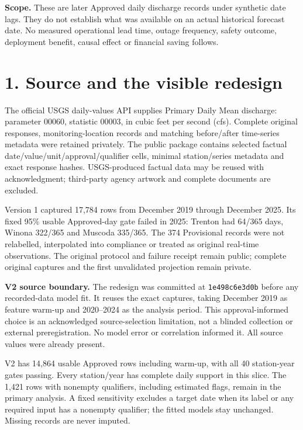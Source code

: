 \documentclass[11pt]{article}
\newcommand{\SourceRows}{14,864}
\newcommand{\QualifiedRows}{1,421}
\newcommand{\SourceGates}{40}
\newcommand{\TrentonApproval}{64}
\newcommand{\WinonaApproval}{322}
\newcommand{\MuscodaApproval}{335}
\begin{document}
\textbf{Scope.} These are later Approved daily discharge records under synthetic date lags. They do not establish what was available on an actual historical forecast date. No measured operational lead time, outage frequency, safety outcome, deployment benefit, causal effect or financial saving follows.

\clearpage
\section*{1. Source and the visible redesign}
The official USGS daily-values API supplies Primary Daily Mean discharge: parameter 00060, statistic 00003, in cubic feet per second (cfs). Complete original responses, monitoring-location records and matching before/after time-series metadata were retained privately. The public package contains selected factual date/value/unit/approval/qualifier cells, minimal station/series metadata and exact response hashes. USGS-produced factual data may be reused with acknowledgment; third-party agency artwork and complete documents are excluded.

Version 1 captured 17,784 rows from December 2019 through December 2025. Its fixed 95\% usable Approved-day gate failed in 2025: Trenton had \TrentonApproval{}/365 days, Winona \WinonaApproval{}/365 and Muscoda \MuscodaApproval{}/365. The 374 Provisional records were not relabelled, interpolated into compliance or treated as original real-time observations. The original protocol and failure receipt remain public; complete original captures and the first unvalidated projection remain private.

\textbf{V2 source boundary.} The redesign was committed at \texttt{1e498c6e3d0b} before any recorded-data model fit. It reuses the exact captures, taking December 2019 as feature warm-up and 2020--2024 as the analysis period. This approval-informed choice is an acknowledged source-selection limitation, not a blinded collection or external preregistration. No model error or correlation informed it. All source values were already present.

V2 has \SourceRows{} usable Approved rows including warm-up, with all \SourceGates{} station-year gates passing. Every station/year has complete daily support in this slice. The \QualifiedRows{} rows with nonempty qualifiers, including estimated flags, remain in the primary analysis. A fixed sensitivity excludes a target date when its label or any required input has a nonempty qualifier; the fitted models stay unchanged. Missing records are never imputed.
\end{document}
